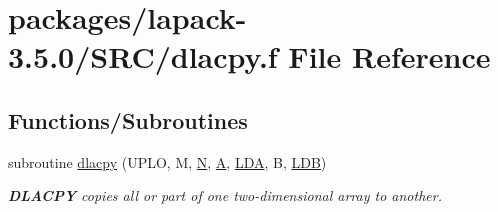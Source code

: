\hypertarget{dlacpy_8f}{}\section{packages/lapack-\/3.5.0/\+S\+R\+C/dlacpy.f File Reference}
\label{dlacpy_8f}
\subsection*{Functions/\+Subroutines}
\begin{DoxyCompactItemize}
\item 
subroutine \hyperlink{group__auxOTHERauxiliary_ga7eb8731ffab2734378157c40964bf788}{dlacpy} (U\+P\+L\+O, M, \hyperlink{polmisc_8c_a0240ac851181b84ac374872dc5434ee4}{N}, \hyperlink{classA}{A}, \hyperlink{example__user_8c_ae946da542ce0db94dced19b2ecefd1aa}{L\+D\+A}, B, \hyperlink{example__user_8c_a50e90a7104df172b5a89a06c47fcca04}{L\+D\+B})
\begin{DoxyCompactList}\small\item\em {\bfseries D\+L\+A\+C\+P\+Y} copies all or part of one two-\/dimensional array to another. \end{DoxyCompactList}\end{DoxyCompactItemize}
